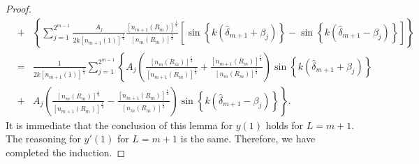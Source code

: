 \documentclass[10pt,a4paper]{amsart}
\begin{document}
\begin{proof}
\begin{eqnarray*}
		&+&\left\{\sum_{j=1}^{2^{m-1}}\frac{A_j}{2k\left[n_{m+1}(1)\right]^{\frac{1}{4}}}\frac{\left[n_{m+1}\left(R_m\right)\right]^{\frac{1}{4}}}{\left[n_{m}\left(R_m\right)\right]^\frac{1}{4}}\left[\sin\left\{k\left(\hat{\delta}_{m+1}+\beta_j\right)\right\}-\sin\left\{k\left(\hat{\delta}_{m+1}-\beta_j\right)\right\}\right]\right\}\\
		&=&\frac{1}{2k\left[n_{m+1}\left(1\right)\right]^{\frac{1}{4}}}\sum_{j=1}^{2^{m-1}}\left\{A_j\left(\frac{\left[n_{m}\left(R_m\right)\right]^{\frac{1}{4}}}{\left[n_{m+1}\left(R_m\right)\right]^\frac{1}{4}}+\frac{\left[n_{m+1}\left(R_m\right)\right]^{\frac{1}{4}}}{\left[n_{m}\left(R_m\right)\right]^\frac{1}{4}}\right)\sin\left\{ k\left(\hat{\delta}_{m+1}+\beta_j\right) \right\}\right.\\
		&+&\left.A_j\left(\frac{\left[n_{m}\left(R_m\right)\right]^{\frac{1}{4}}}{\left[n_{m+1}\left(R_m\right)\right]^\frac{1}{4}}-\frac{\left[n_{m+1}\left(R_m\right)\right]^{\frac{1}{4}}}{\left[n_{m}\left(R_m\right)\right]^\frac{1}{4}}\right)\sin\left\{k\left(\hat{\delta}_{m+1}-\beta_j\right)\right\}\right\}.
\end{eqnarray*}
It is immediate that the conclusion of this lemma for $y(1)$ holds for $L=m+1$.
The reasoning for $y'(1)$ for $L=m+1$ is the same. Therefore, we have completed the induction.
\end{proof}
\end{document}
